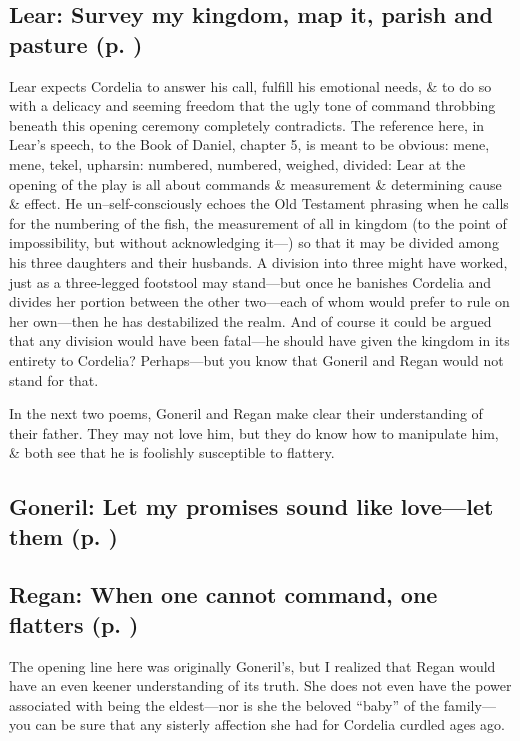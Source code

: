 \subsection*{Lear: Survey my kingdom, map it, parish and pasture (p. \pageref{ch:lear_ac})}
Lear expects Cordelia to answer his call, fulfill his emotional needs, \& to do so with a delicacy and seeming freedom that the ugly tone of command throbbing beneath this opening ceremony completely contradicts. The reference here, in Lear's speech, to the Book of Daniel, chapter 5, is meant to be obvious: mene, mene, tekel, upharsin: numbered, numbered, weighed, divided: Lear at the opening of the play is all about commands \& measurement \& determining cause \& effect. He un--self-consciously echoes the Old Testament phrasing when he calls for the numbering of the fish, the measurement of all in kingdom (to the point of impossibility, but without acknowledging it---) so that it may be divided among his three daughters and their husbands. A division into three might have worked, just as a three-legged footstool may stand---but once he banishes Cordelia and divides her portion between the other two---each of whom would prefer to rule on her own---then he has destabilized the realm. And of course it could be argued that any division would have been fatal---he should have given the kingdom in its entirety to Cordelia? Perhaps---but you know that Goneril and Regan would not stand for that.

In the next two poems, Goneril and Regan make clear their understanding of their father. They may not love him, but they do know how to manipulate him, \& both see that he is foolishly susceptible to flattery.

\subsection*{Goneril: Let my promises sound like love---let them (p. \pageref{ch:lear_ad})}

\subsection*{Regan: When one cannot command, one flatters (p. \pageref{ch:lear_ae})}

The opening line here was originally Goneril's, but I realized that Regan would have an even keener understanding of its truth. She does not even have the power associated with being the eldest---nor is she the beloved ``baby'' of the family---you can be sure that any sisterly affection she had for Cordelia curdled ages ago.


